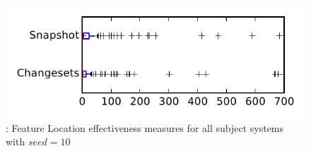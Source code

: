 
\begin{figure}
\centering
\includegraphics[height=0.4\textheight]{figures/flt_seed/rq1_tiny_10}
\caption{\rone: Feature Location effectiveness measures for all subject systems with $seed=10$}
\label{fig:flt_seed:rq1:tiny}
\end{figure}
